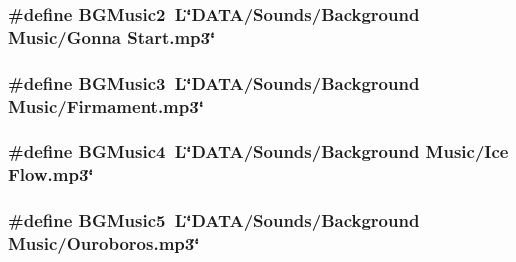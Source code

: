 \subsubsection[{B\+G\+Music2}]{\setlength{\rightskip}{0pt plus 5cm}\#define B\+G\+Music2~L\char`\"{}D\+A\+T\+A/Sounds/Background Music/Gonna Start.\+mp3\char`\"{}}\label{_b_o_w-a_01film_01guessing_01game_8cpp_a7e4f5ce398c929d5f803303c5ecca704}
\hypertarget{_b_o_w-a_01film_01guessing_01game_8cpp_ad71937906f191df89adc7eb7369b4a34}{}
\subsubsection[{B\+G\+Music3}]{\setlength{\rightskip}{0pt plus 5cm}\#define B\+G\+Music3~L\char`\"{}D\+A\+T\+A/Sounds/Background Music/Firmament.\+mp3\char`\"{}}\label{_b_o_w-a_01film_01guessing_01game_8cpp_ad71937906f191df89adc7eb7369b4a34}
\hypertarget{_b_o_w-a_01film_01guessing_01game_8cpp_a075f81b2faca54b6a93b1bf9f49e33bb}{}
\subsubsection[{B\+G\+Music4}]{\setlength{\rightskip}{0pt plus 5cm}\#define B\+G\+Music4~L\char`\"{}D\+A\+T\+A/Sounds/Background Music/Ice Flow.\+mp3\char`\"{}}\label{_b_o_w-a_01film_01guessing_01game_8cpp_a075f81b2faca54b6a93b1bf9f49e33bb}
\hypertarget{_b_o_w-a_01film_01guessing_01game_8cpp_aaec572860153cad71963667e40598c68}{}
\subsubsection[{B\+G\+Music5}]{\setlength{\rightskip}{0pt plus 5cm}\#define B\+G\+Music5~L\char`\"{}D\+A\+T\+A/Sounds/Background Music/Ouroboros.\+mp3\char`\"{}}\label{_b_o_w-a_01film_01guessing_01game_8cpp_aaec572860153cad71963667e40598c68}
\hypertarget{_b_o_w-a_01film_01guessing_01game_8cpp_a6ef7ac6d245509521d483e136651598f}{}
